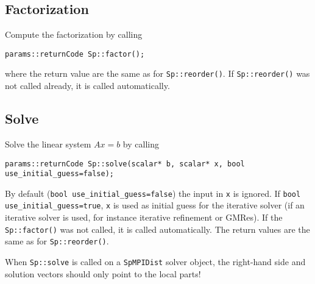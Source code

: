 \documentclass{article}
\begin{document}
\subsection{Factorization}
Compute the factorization by calling
\begin{lstlisting}[style=C]
  params::returnCode Sp::factor();
\end{lstlisting}
where the return value are the same as for
\lstinline[style=C]!Sp::reorder()!.  If
\lstinline[style=C]!Sp::reorder()! was not called already, it is
called automatically.


\subsection{Solve}\label{subsec:use_solve}
Solve the linear system $Ax=b$ by calling
\begin{lstlisting}[style=C]
  params::returnCode Sp::solve(scalar* b, scalar* x, bool use_initial_guess=false);
\end{lstlisting}
By default (\lstinline[style=C]!bool use_initial_guess=false!) the
input in \lstinline[style=C]!x! is ignored. If
\lstinline[style=C]!bool use_initial_guess=true!,
\lstinline[style=C]!x! is used as initial guess for the iterative
solver (if an iterative solver is used, for instance iterative
refinement or GMRes). If the \lstinline[style=C]!Sp::factor()! was not
called, it is called automatically. The return values are the same as
for \lstinline[style=C]!Sp::reorder()!.

When \lstinline[style=C]!Sp::solve! is called on a
\lstinline[style=C]!SpMPIDist! solver object, the right-hand side and
solution vectors should only point to the local parts!
\end{document}
